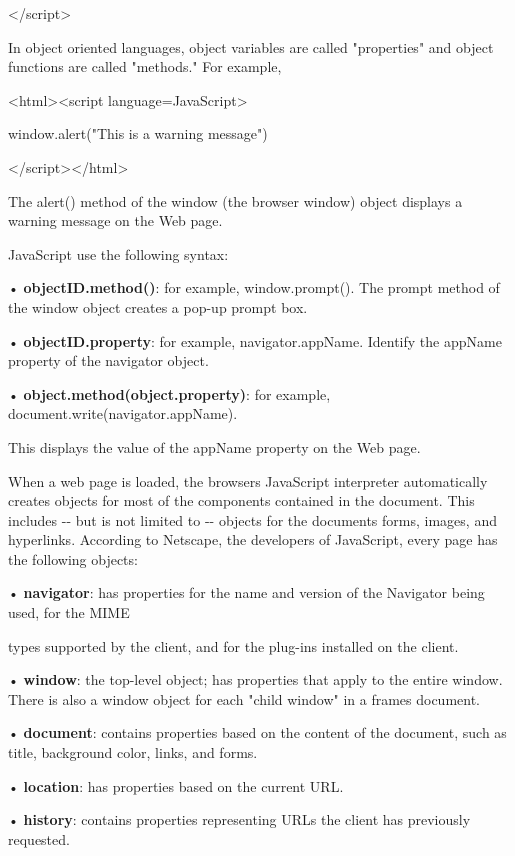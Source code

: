 \documentclass[
]{article}
\begin{document}
\textless/script\textgreater{}

In object oriented languages, object variables are called "properties"
and object functions are called "methods." For example,

\textless html\textgreater\textless script
language=JavaScript\textgreater{}

window.alert("This is a warning message")

\textless/script\textgreater\textless/html\textgreater{}

The alert() method of the window (the browser window) object displays a
warning message on the Web page.

JavaScript use the following syntax:

• \textbf{objectID.method()}: for example, window.prompt(). The prompt
method of the window object creates a pop-up prompt box.

• \textbf{objectID.property}: for example, navigator.appName. Identify
the appName property of the navigator object.

• \textbf{object.method(object.property)}: for example,
document.write(navigator.appName).

This displays the value of the appName property on the Web page.

When a web page is loaded, the browser\textquotesingle s JavaScript
interpreter automatically creates objects for most of the components
contained in the document. This includes -\/- but is not limited to -\/-
objects for the document\textquotesingle s forms, images, and
hyperlinks. According to Netscape, the developers of JavaScript, every
page has the following objects:

• \textbf{navigator}: has properties for the name and version of the
Navigator being used, for the MIME

types supported by the client, and for the plug-ins installed on the
client.

• \textbf{window}: the top-level object; has properties that apply to
the entire window. There is also a window object for each "child window"
in a frames document.

• \textbf{document}: contains properties based on the content of the
document, such as title, background color, links, and forms.

• \textbf{location}: has properties based on the current URL.

• \textbf{history}: contains properties representing URLs the client has
previously requested.
\end{document}
